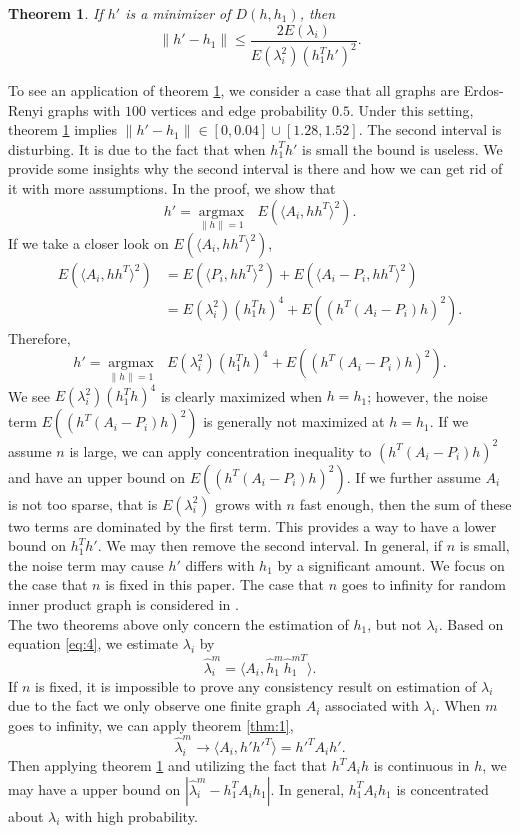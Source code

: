 \documentclass[10pt,journal,compsoc]{IEEEtran}
\newtheorem{theorem}{Theorem}[section]
\begin{document}
\begin{theorem}
	\label{thm:2}
	If $h'$ is a minimizer of $D(h,h_1)$, then 
	\[\|h'-h_1\| \leq \frac{2 E(\lambda_i)}{E(\lambda_i^2)(h_1^T h')^2}. \]
\end{theorem}

\noindent	To see an application of theorem \ref{thm:2}, we consider a case that all graphs are Erdos-Renyi graphs with $100$ vertices and edge probability $0.5$. Under this setting, theorem \ref{thm:2} implies  $\|h'-h_1\| \in [0,0.04] \cup [1.28,1.52]$. The second interval is disturbing. It is due to the fact that when $h_1^T h'$ is small the bound is useless. We provide some insights why the second interval is there and how we can get rid of it with more assumptions. In the proof, we show that
\[h'= \underset{\|h\| =1}{\operatorname{argmax}} \text{ } E(\langle A_i,h h^T \rangle ^2). \]
If we take a closer look on $E(\langle A_i,h h^T \rangle ^2)$,
\begin{align*}
	E(\langle A_i,h h^T \rangle ^2) &= E(\langle P_i,h h^T \rangle ^2)+E(\langle A_i-P_i,h h^T \rangle ^2) \\
	&=E(\lambda_i^2)(h_1^T h)^4+E((h^T (A_i-P_i)h) ^2).
\end{align*}
Therefore, 
\[h'= \underset{\|h\| =1}{\operatorname{argmax}} \text{ } E(\lambda_i^2)(h_1^T h)^4+E((h^T (A_i-P_i)h) ^2) .\]
We see $E(\lambda_i^2)(h_1^T h)^4$ is clearly maximized when $h=h_1$; however, the noise term $E((h^T (A_i-P_i)h) ^2)$ is generally not maximized at $h=h_1$. If we assume $n$ is large, we can apply concentration inequality to $(h^T (A_i-P_i)h) ^2$ and have an upper bound on $E((h^T (A_i-P_i)h) ^2)$. If we further assume $A_i$ is not too sparse, that is $E(\lambda_i^2)$ grows with $n$ fast enough, then the sum of these two terms are dominated by the first term. This provides a way to have a lower bound on $h_1^T h'$. We may then remove the second interval. In general, if $n$ is small, the noise term may cause $h'$ differs with $h_1$ by a significant amount. We focus on the case that $n$ is fixed in this paper. The case that $n$ goes to infinity for random inner product graph is considered in \cite{athreya2013limit}.\\


\noindent The two theorems above only concern the estimation of $h_1$, but not $\lambda_i$. Based on equation \eqref{eq:4}, we estimate $\lambda_i$ by
\[\hat{\lambda}_i^m= \langle A_i,\hat{h}_1^m \hat{h}_1^{m T} \rangle. \]
If $n$ is fixed, it is impossible to prove any consistency result on estimation of $\lambda_i$ due to the fact we only observe one finite graph $A_i$ associated with $\lambda_i$. When $m$ goes to infinity, we can apply theorem \ref{thm:1},
\[\hat{\lambda}_i^m \rightarrow \langle A_i,h' h'^T \rangle = h'^T A_i h'.\]
Then applying theorem \ref{thm:2} and utilizing the fact that $h^T A_i h$ is continuous in $h$, we may have a upper bound on $|\hat{\lambda}_i^m - h_1^T A_i h_1|$. In general, $h_1^T A_i h_1$ is concentrated about $\lambda_i$ with high probability. 
\end{document}
